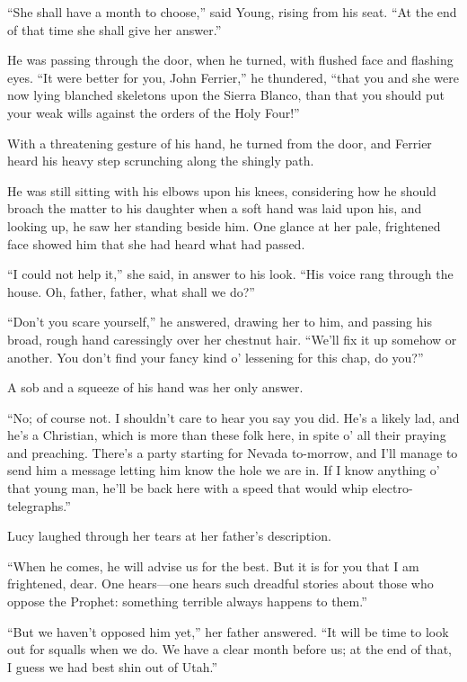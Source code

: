 \documentclass[12pt]{book}
\begin{document}
“She shall have a month to choose,” said Young, rising from his seat. “At the end of that time she shall give her answer.” 

He was passing through the door, when he turned, with flushed face and flashing eyes. “It were better for you, John Ferrier,” he thundered, “that you and she were now lying blanched skeletons upon the Sierra Blanco, than that you should put your weak wills against the orders of the Holy Four!” 

With a threatening gesture of his hand, he turned from the door, and Ferrier heard his heavy step scrunching along the shingly path. 

He was still sitting with his elbows upon his knees, considering how he should broach the matter to his daughter when a soft hand was laid upon his, and looking up, he saw her standing beside him. One glance at her pale, frightened face showed him that she had heard what had passed. 

“I could not help it,” she said, in answer to his look. “His voice rang through the house. Oh, father, father, what shall we do?” 

“Don’t you scare yourself,” he answered, drawing her to him, and passing his broad, rough hand caressingly over her chestnut hair. “We’ll fix it up somehow or another. You don’t find your fancy kind o’ lessening for this chap, do you?” 

A sob and a squeeze of his hand was her only answer. 

“No; of course not. I shouldn’t care to hear you say you did. He’s a likely lad, and he’s a Christian, which is more than these folk here, in spite o’ all their praying and preaching. There’s a party starting for Nevada to-morrow, and I’ll manage to send him a message letting him know the hole we are in. If I know anything o’ that young man, he’ll be back here with a speed that would whip electro-telegraphs.” 

Lucy laughed through her tears at her father’s description. 

“When he comes, he will advise us for the best. But it is for you that I am frightened, dear. One hears—one hears such dreadful stories about those who oppose the Prophet: something terrible always happens to them.” 

“But we haven’t opposed him yet,” her father answered. “It will be time to look out for squalls when we do. We have a clear month before us; at the end of that, I guess we had best shin out of Utah.” 
\end{document}
